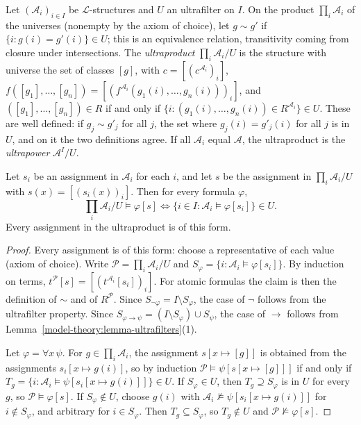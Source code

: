 \begin{definition}\label{model-theory:definition-ultraproduct}
Let $(\mathcal{A}_i)_{i \in I}$ be $\mathcal{L}$-structures and $U$ an ultrafilter on $I$. On the product $\prod_i\mathcal{A}_i$ of the universes (nonempty
by the axiom of choice), let $g \sim g'$ if $\{i : g(i) = g'(i)\} \in U$; this is an equivalence relation, transitivity coming from closure under
intersections. The \emph{ultraproduct} $\prod_i\mathcal{A}_i/U$ is the structure with universe the set of classes $[g]$, with
$c = [(c^{\mathcal{A}_i})_i]$, $f([g_1], \ldots, [g_n]) = [(f^{\mathcal{A}_i}(g_1(i), \ldots, g_n(i)))_i]$, and $([g_1], \ldots, [g_n]) \in R$ if and only if
$\{i : (g_1(i), \ldots, g_n(i)) \in R^{\mathcal{A}_i}\} \in U$. These are well defined: if $g_j \sim g'_j$ for all $j$, the set where $g_j(i) = g'_j(i)$ for all
$j$ is in $U$, and on it the two definitions agree. If all $\mathcal{A}_i$ equal $\mathcal{A}$, the ultraproduct is the \emph{ultrapower} $\mathcal{A}^I/U$.
\end{definition}

\begin{theorem}[Łoś]\label{model-theory:theorem-los}
Let $s_i$ be an assignment in $\mathcal{A}_i$ for each $i$, and let $s$ be the assignment in $\prod_i\mathcal{A}_i/U$ with $s(x) = [(s_i(x))_i]$. Then for every
formula $\varphi$,
\[
\textstyle\prod_i\mathcal{A}_i/U \models \varphi[s] \iff \{i \in I : \mathcal{A}_i \models \varphi[s_i]\} \in U.
\]
Every assignment in the ultraproduct is of this form.
\end{theorem}

\begin{proof}
Every assignment is of this form: choose a representative of each value (axiom of choice). Write $\mathcal{P} = \prod_i\mathcal{A}_i/U$ and
$S_\varphi = \{i : \mathcal{A}_i \models \varphi[s_i]\}$. By induction on terms, $t^{\mathcal{P}}[s] = [(t^{\mathcal{A}_i}[s_i])_i]$. For atomic formulas the claim
is then the definition of $\sim$ and of $R^{\mathcal{P}}$. Since $S_{\neg\varphi} = I \setminus S_\varphi$, the case of $\neg$ follows from the ultrafilter property.
Since $S_{\varphi \to \psi} = (I \setminus S_\varphi) \cup S_\psi$, the case of $\to$ follows from Lemma~\ref{model-theory:lemma-ultrafilters}(1).

Let $\varphi = \forall x\,\psi$. For $g \in \prod_i\mathcal{A}_i$, the assignment $s[x \mapsto [g]]$ is obtained from the assignments $s_i[x \mapsto g(i)]$, so by
induction $\mathcal{P} \models \psi[s[x \mapsto [g]]]$ if and only if $T_g = \{i : \mathcal{A}_i \models \psi[s_i[x \mapsto g(i)]]\} \in U$. If $S_\varphi \in U$, then
$T_g \supseteq S_\varphi$ is in $U$ for every $g$, so $\mathcal{P} \models \varphi[s]$. If $S_\varphi \notin U$, choose $g(i)$ with
$\mathcal{A}_i \not\models \psi[s_i[x \mapsto g(i)]]$ for $i \notin S_\varphi$, and arbitrary for $i \in S_\varphi$. Then $T_g \subseteq S_\varphi$, so $T_g \notin U$ and
$\mathcal{P} \not\models \varphi[s]$.
\end{proof}


